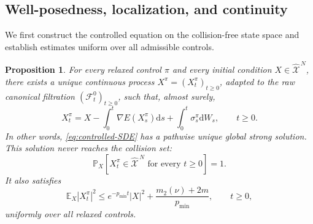 \documentclass[11pt]{article}
\def\E{\mathbb{E}}
\def\P{\mathbb{P}}
\def\Fc{{\mathcal F}}
\def\Xc{{\mathcal X}}
\def\hX{\widehat{\Xc}^{\,N}}
\newcommand{\dd}{\mathrm{d}}
\newcommand{\pmin}{p_{\min}}
\newtheorem{proposition}[theorem]{Proposition}
\theoremstyle{definition}
\theoremstyle{remark}
\numberwithin{equation}{section}
\begin{document}
\subsection{Well-posedness, localization, and continuity}\label{subsec:controlled-wellposedness}
We first construct the controlled equation on the collision-free state space and establish estimates
uniform over all admissible controls.
\begin{proposition}\label{prop:controlled-dynamics}
For every relaxed control $\pi$ and every initial condition $X\in\hX$, there exists a unique
continuous process $X^\pi=(X_t^\pi)_{t\ge0}$, adapted to the raw canonical filtration
$(\Fc_t^0)_{t\ge0}$, such that, almost surely,
\begin{equation}\label{eq:controlled-integral-form}
 X_t^\pi
 =X-\int_0^t\nabla E(X_s^\pi)\dd s
 +\int_0^t\sigma_s^\pi\dd W_s,
 \qquad t\ge0.
\end{equation}
In other words, \eqref{eq:controlled-SDE} has a pathwise unique global strong solution.  This
solution never reaches the collision set:
\begin{equation}\label{eq:no-collision-control}
 \P_X\left[X_t^\pi\in\hX\text{ for every }t\ge0\right]=1.
\end{equation}
It also satisfies
\begin{equation}\label{eq:moment-controlled}
 \E_X|X_t^\pi|^2
 \le e^{-\pmin t}|X|^2+
 \frac{m_2(\nu)+2m}{\pmin},
 \qquad t\ge0,
\end{equation}
uniformly over all relaxed controls.
\end{proposition}
\end{document}
